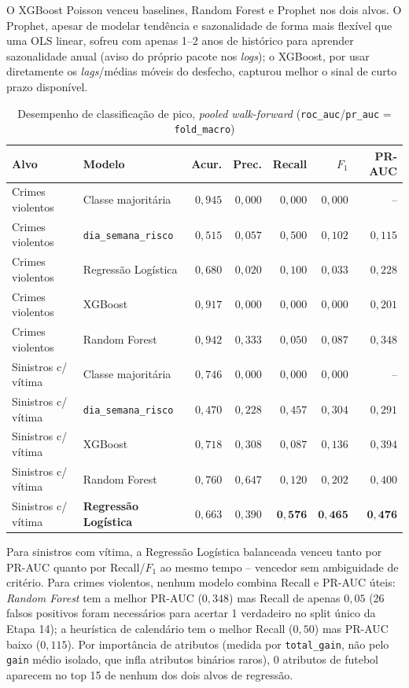 \documentclass[12pt]{article}
\begin{document}
O XGBoost Poisson venceu baselines, Random Forest e Prophet nos dois
alvos. O Prophet, apesar de modelar tendência e sazonalidade de forma
mais flexível que uma OLS linear, sofreu com apenas 1--2 anos de
histórico para aprender sazonalidade anual (aviso do próprio pacote nos
\emph{logs}); o XGBoost, por usar diretamente os \emph{lags}/médias
móveis do desfecho, capturou melhor o sinal de curto prazo disponível.

\begin{table}[ht]
\centering
\caption{Desempenho de classificação de pico, \emph{pooled walk-forward}
(\texttt{roc\_auc}/\texttt{pr\_auc} = \texttt{fold\_macro})}
\label{tab:classificacao-completa}
\small
\begin{tabular}{@{}llrrrrr@{}}
\toprule
\textbf{Alvo} & \textbf{Modelo} & \textbf{Acur.} & \textbf{Prec.} & \textbf{Recall} & \textbf{$F_1$} & \textbf{PR-AUC} \\
\midrule
Crimes violentos & Classe majoritária   & $0,945$ & $0,000$ & $0,000$ & $0,000$ & --      \\
Crimes violentos & \texttt{dia\_semana\_risco} & $0,515$ & $0,057$ & $0,500$ & $0,102$ & $0,115$ \\
Crimes violentos & Regressão Logística  & $0,680$ & $0,020$ & $0,100$ & $0,033$ & $0,228$ \\
Crimes violentos & XGBoost              & $0,917$ & $0,000$ & $0,000$ & $0,000$ & $0,201$ \\
Crimes violentos & Random Forest        & $0,942$ & $0,333$ & $0,050$ & $0,087$ & $0,348$ \\
\midrule
Sinistros c/ vítima & Classe majoritária  & $0,746$ & $0,000$ & $0,000$ & $0,000$ & --      \\
Sinistros c/ vítima & \texttt{dia\_semana\_risco} & $0,470$ & $0,228$ & $0,457$ & $0,304$ & $0,291$ \\
Sinistros c/ vítima & XGBoost             & $0,718$ & $0,308$ & $0,087$ & $0,136$ & $0,394$ \\
Sinistros c/ vítima & Random Forest       & $0,760$ & $0,647$ & $0,120$ & $0,202$ & $0,400$ \\
Sinistros c/ vítima & \textbf{Regressão Logística} & $0,663$ & $0,390$ & $\mathbf{0,576}$ & $\mathbf{0,465}$ & $\mathbf{0,476}$ \\
\bottomrule
\end{tabular}
\end{table}

Para sinistros com vítima, a Regressão Logística balanceada venceu tanto
por PR-AUC quanto por Recall/$F_1$ ao mesmo tempo -- vencedor sem
ambiguidade de critério. Para crimes violentos, nenhum modelo combina
Recall e PR-AUC úteis: \emph{Random Forest} tem a melhor PR-AUC ($0,348$)
mas Recall de apenas $0,05$ (26 falsos positivos foram necessários para
acertar 1 verdadeiro no split único da Etapa 14); a heurística de
calendário tem o melhor Recall ($0,50$) mas PR-AUC baixo ($0,115$). Por
importância de atributos (medida por \texttt{total\_gain}, não pelo
\texttt{gain} médio isolado, que infla atributos binários raros), 0
atributos de futebol aparecem no top 15 de nenhum dos dois alvos de
regressão.
\end{document}
